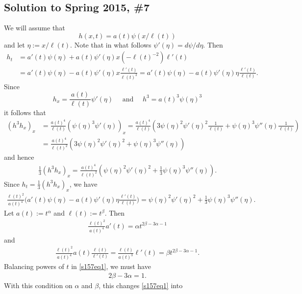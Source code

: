 \subsection*{Solution to Spring 2015, \#7}\label{s157}
We will assume that $$h(x, t) = a(t)\psi(x/\ell(t))$$ and let $\eta := x/\ell(t)$. Note that in what follows $\psi'(\eta) = d\psi/d\eta$.
Then
\begin{align*}
h_{t} &= a'(t)\psi(\eta) + a(t)\psi'(\eta)x(-\ell(t)^{-2})\ell'(t)\\
& = a'(t)\psi(\eta) - a(t)\psi'(\eta)x\frac{\ell'(t)}{\ell(t)^{2}} = a'(t)\psi(\eta) - a(t)\psi'(\eta)\eta\frac{\ell'(t)}{\ell(t)}.
\end{align*}
Since
$$h_{x} = \frac{a(t)}{\ell(t)}\psi'(\eta) \quad \text{ and } \quad h^{3} = a(t)^{3}\psi(\eta)^{3}$$
it follows that
\begin{align*}
(h^{3}h_{x})_{x} &= \frac{a(t)^{4}}{\ell(t)}(\psi(\eta)^{3}\psi'(\eta))_{x} = \frac{a(t)^{4}}{\ell(t)}(3\psi(\eta)^{2}\psi'(\eta)^{2}\frac{1}{\ell(t)} + \psi(\eta)^{3}\psi''(\eta)\frac{1}{\ell(t)})\\
&=\frac{a(t)^{4}}{\ell(t)^{2}}(3\psi(\eta)^{2}\psi'(\eta)^{2} + \psi(\eta)^{3}\psi''(\eta))
\end{align*}
and hence
\begin{align*}
\frac{1}{3}(h^{3}h_{x})_{x} = \frac{a(t)^{4}}{\ell(t)^{2}}(\psi(\eta)^{2}\psi'(\eta)^{2} + \frac{1}{3}\psi(\eta)^{3}\psi''(\eta)).
\end{align*}
Since $h_{t} = \frac{1}{3}(h^{3}h_{x})_{x}$, we have
\begin{align}\label{s157eq1}
\frac{\ell(t)^{2}}{a(t)^{4}}\bigg(a'(t)\psi(\eta) - a(t)\psi'(\eta)\eta\frac{\ell'(t)}{\ell(t)}\bigg) = \psi(\eta)^{2}\psi'(\eta)^{2} + \frac{1}{3}\psi(\eta)^{3}\psi''(\eta).
\end{align}
Let $a(t) := t^{\alpha}$ and $\ell(t) := t^{\beta}$. Then
\begin{align*}
\frac{\ell(t)^{2}}{a(t)^{4}}a'(t) = \alpha t^{2\beta - 3\alpha - 1}
\end{align*}
and
\begin{align*}
\frac{\ell(t)^{2}}{a(t)^{4}}a(t)\frac{\ell(t)}{\ell'(t)} = \frac{\ell(t)}{a(t)^{3}}\ell'(t) = \beta t^{2\beta - 3\alpha - 1}.
\end{align*}
Balancing powers of $t$ in \eqref{s157eq1}, we must have
\begin{align}\label{s157eq2}
2\beta - 3\alpha = 1.
\end{align}
With this condition on $\alpha$ and $\beta$, this changes \eqref{s157eq1} into

